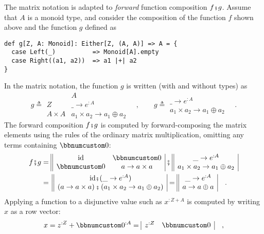 The matrix notation is adapted to \emph{forward} function composition
$f\bef g$. Assume that $A$ is a monoid type, and consider the composition
of the function $f$ shown above and the function $g$ defined as
\begin{lstlisting}
def g[Z, A: Monoid]: Either[Z, (A, A)] => A = {
  case Left(_)          => Monoid[A].empty
  case Right((a1, a2))  => a1 |+| a2
}
\end{lstlisting}
In the matrix notation, the function $g$ is written (with and without
types) as
\[
g\triangleq\begin{array}{|c||c|}
 & A\\
\hline Z & \_\rightarrow e^{:A}\\
A\times A & a_{1}\times a_{2}\rightarrow a_{1}\oplus a_{2}
\end{array}\quad,\quad\quad g\triangleq\begin{array}{||c|}
\_\rightarrow e^{:A}\\
a_{1}\times a_{2}\rightarrow a_{1}\oplus a_{2}
\end{array}\quad.
\]
The forward composition $f\bef g$ is computed by forward-composing
the matrix elements using the rules of the ordinary matrix multiplication,
omitting any terms containing $\bbnum 0$:
\begin{align*}
f\bef g & =\begin{array}{||cc|}
\text{id} & \bbnum 0\\
\bbnum 0 & a\rightarrow a\times a
\end{array}\,\bef\,\begin{array}{||c|}
\_\rightarrow e^{:A}\\
a_{1}\times a_{2}\rightarrow a_{1}\oplus a_{2}
\end{array}\\
 & =\,\begin{array}{||c|}
\text{id}\bef(\_\rightarrow e^{:A})\\
\left(a\rightarrow a\times a\right)\bef\left(a_{1}\times a_{2}\rightarrow a_{1}\oplus a_{2}\right)
\end{array}=\begin{array}{||c|}
\_\rightarrow e^{:A}\\
a\rightarrow a\oplus a
\end{array}\quad.
\end{align*}
Applying a function to a disjunctive value such as $x^{:Z+A}$ is
computed by writing $x$ as a row vector:
\[
x=z^{:Z}+\bbnum 0^{:A}=\begin{array}{|cc|}
z^{:Z} & \bbnum 0\end{array}\quad,
\]
